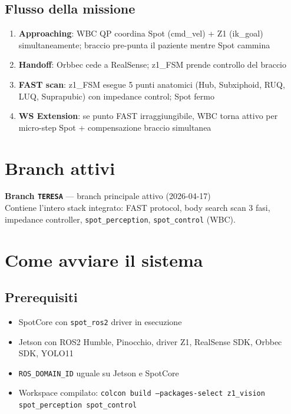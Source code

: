 \documentclass[a4paper,11pt]{article}
\begin{document}
\subsection*{Flusso della missione}
\begin{enumerate}
  \item \textbf{Approaching}: WBC QP coordina Spot (cmd\_vel) + Z1 (ik\_goal) simultaneamente;
        braccio pre-punta il paziente mentre Spot cammina
  \item \textbf{Handoff}: Orbbec cede a RealSense; z1\_FSM prende controllo del braccio
  \item \textbf{FAST scan}: z1\_FSM esegue 5 punti anatomici (Hub, Subxiphoid, RUQ, LUQ, Suprapubic)
        con impedance control; Spot fermo
  \item \textbf{WS Extension}: se punto FAST irraggiungibile, WBC torna attivo per
        micro-step Spot + compensazione braccio simultanea
\end{enumerate}

\section{Branch attivi}

\begin{branchboxb}
\textbf{\textcolor{branchpurple}{Branch \texttt{TERESA}}} — branch principale attivo (2026-04-17)\\
Contiene l'intero stack integrato: FAST protocol, body search scan 3 fasi,
impedance controller, \texttt{spot\_perception}, \texttt{spot\_control} (WBC).
\end{branchboxb}

\section{Come avviare il sistema}

\subsection*{Prerequisiti}
\begin{itemize}[leftmargin=1.5em]
  \item SpotCore con \texttt{spot\_ros2} driver in esecuzione
  \item Jetson con ROS2 Humble, Pinocchio, driver Z1, RealSense SDK, Orbbec SDK, YOLO11
  \item \texttt{ROS\_DOMAIN\_ID} uguale su Jetson e SpotCore
  \item Workspace compilato: \texttt{colcon build --packages-select z1\_vision spot\_perception spot\_control}
\end{itemize}
\end{document}
